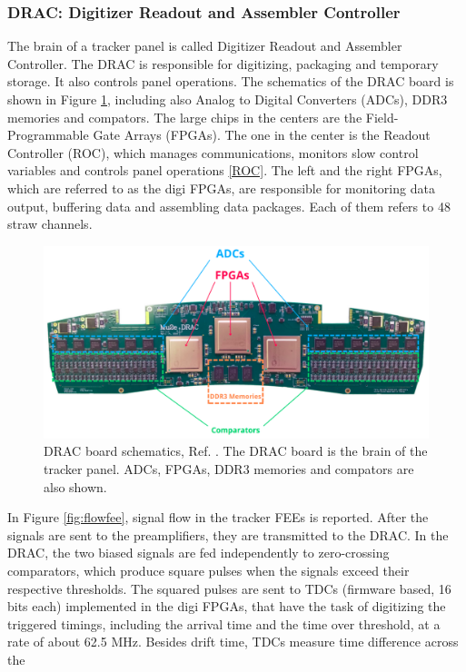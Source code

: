 \subsubsection{DRAC: Digitizer Readout and Assembler Controller}\label{DRAC}
The brain of a tracker panel is called Digitizer Readout and Assembler Controller. 
The DRAC is responsible for digitizing, packaging and temporary storage. It also controls 
panel operations. The schematics of the DRAC board is shown in Figure \ref{fig:drac}, including also 
Analog to Digital Converters (ADCs), DDR3 memories and compators. 
The large chips in the centers are the Field-Programmable Gate Arrays (FPGAs). The one 
in the center is the Readout Controller (ROC), which manages communications, monitors 
slow control variables and controls panel operations \ref{ROC}. The left and the right 
FPGAs, which are referred to as the digi FPGAs, are responsible for monitoring data output, 
buffering data and assembling data packages. Each of them refers to 48 straw channels. 
\begin{figure}[!h]
\centering
\includegraphics[width =\textwidth]{figures/png/Screenshot_20240204_115052.png}
\caption{DRAC board schematics, Ref. \cite{drac}. 
The DRAC board is the brain of the tracker panel. ADCs, FPGAs, DDR3 memories and compators are also shown.}
\label{fig:drac}
\end{figure}
In Figure \ref{fig:flowfee}, signal flow in the tracker FEEs is reported.
After the signals are sent to the preamplifiers, they are transmitted to the DRAC.
In the DRAC, the two biased signals are fed independently to 
zero-crossing comparators, which produce square pulses when the signals exceed 
their respective thresholds. The squared pulses are sent to TDCs 
(firmware based, 16 bits each) implemented in the digi FPGAs, that have the task 
of digitizing the triggered timings, including the arrival time and the time over threshold, 
at a rate of about 62.5 MHz. Besides drift time, TDCs measure time difference across the 
